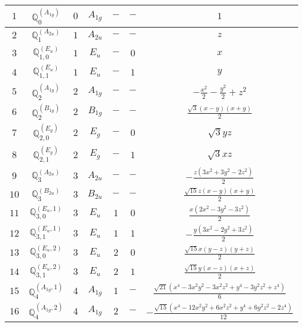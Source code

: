 \documentclass[fleqn,10pt,landscape]{article}
\begin{document}
\begin{itemize}
\begin{center}
\begin{longtable}{ccccccc}
$ 1 $ & $ \mathbb{Q}_{0}^{(A_{1g})} $ & $ 0 $ & $ A_{1g} $ & $ - $ & $ - $ & $ 1 $ \\ \hline
$ 2 $ & $ \mathbb{Q}_{1}^{(A_{2u})} $ & $ 1 $ & $ A_{2u} $ & $ - $ & $ - $ & $ z $ \\
$ 3 $ & $ \mathbb{Q}_{1,0}^{(E_{u})} $ & $ 1 $ & $ E_{u} $ & $ - $ & $ 0 $ & $ x $ \\
$ 4 $ & $ \mathbb{Q}_{1,1}^{(E_{u})} $ & $ 1 $ & $ E_{u} $ & $ - $ & $ 1 $ & $ y $ \\ \hline
$ 5 $ & $ \mathbb{Q}_{2}^{(A_{1g})} $ & $ 2 $ & $ A_{1g} $ & $ - $ & $ - $ & $ - \frac{x^{2}}{2} - \frac{y^{2}}{2} + z^{2} $ \\
$ 6 $ & $ \mathbb{Q}_{2}^{(B_{1g})} $ & $ 2 $ & $ B_{1g} $ & $ - $ & $ - $ & $ \frac{\sqrt{3} \left(x - y\right) \left(x + y\right)}{2} $ \\
$ 7 $ & $ \mathbb{Q}_{2,0}^{(E_{g})} $ & $ 2 $ & $ E_{g} $ & $ - $ & $ 0 $ & $ \sqrt{3} y z $ \\
$ 8 $ & $ \mathbb{Q}_{2,1}^{(E_{g})} $ & $ 2 $ & $ E_{g} $ & $ - $ & $ 1 $ & $ \sqrt{3} x z $ \\ \hline
$ 9 $ & $ \mathbb{Q}_{3}^{(A_{2u})} $ & $ 3 $ & $ A_{2u} $ & $ - $ & $ - $ & $ - \frac{z \left(3 x^{2} + 3 y^{2} - 2 z^{2}\right)}{2} $ \\
$ 10 $ & $ \mathbb{Q}_{3}^{(B_{2u})} $ & $ 3 $ & $ B_{2u} $ & $ - $ & $ - $ & $ \frac{\sqrt{15} z \left(x - y\right) \left(x + y\right)}{2} $ \\
$ 11 $ & $ \mathbb{Q}_{3,0}^{(E_{u},1)} $ & $ 3 $ & $ E_{u} $ & $ 1 $ & $ 0 $ & $ \frac{x \left(2 x^{2} - 3 y^{2} - 3 z^{2}\right)}{2} $ \\
$ 12 $ & $ \mathbb{Q}_{3,1}^{(E_{u},1)} $ & $ 3 $ & $ E_{u} $ & $ 1 $ & $ 1 $ & $ - \frac{y \left(3 x^{2} - 2 y^{2} + 3 z^{2}\right)}{2} $ \\
$ 13 $ & $ \mathbb{Q}_{3,0}^{(E_{u},2)} $ & $ 3 $ & $ E_{u} $ & $ 2 $ & $ 0 $ & $ \frac{\sqrt{15} x \left(y - z\right) \left(y + z\right)}{2} $ \\
$ 14 $ & $ \mathbb{Q}_{3,1}^{(E_{u},2)} $ & $ 3 $ & $ E_{u} $ & $ 2 $ & $ 1 $ & $ \frac{\sqrt{15} y \left(x - z\right) \left(x + z\right)}{2} $ \\ \hline
$ 15 $ & $ \mathbb{Q}_{4}^{(A_{1g},1)} $ & $ 4 $ & $ A_{1g} $ & $ 1 $ & $ - $ & $ \frac{\sqrt{21} \left(x^{4} - 3 x^{2} y^{2} - 3 x^{2} z^{2} + y^{4} - 3 y^{2} z^{2} + z^{4}\right)}{6} $ \\
$ 16 $ & $ \mathbb{Q}_{4}^{(A_{1g},2)} $ & $ 4 $ & $ A_{1g} $ & $ 2 $ & $ - $ & $ - \frac{\sqrt{15} \left(x^{4} - 12 x^{2} y^{2} + 6 x^{2} z^{2} + y^{4} + 6 y^{2} z^{2} - 2 z^{4}\right)}{12} $ \\ \hline

\end{longtable}
\end{center}
\end{itemize}
\end{document}

